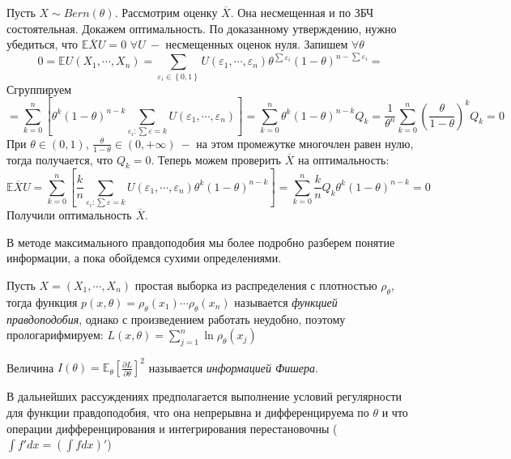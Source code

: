 \begin{example}
Пусть $X \sim Bern\left(\theta\right)$. Рассмотрим оценку $\overline{X}$. Она несмещенная и по ЗБЧ состоятельная.  Докажем оптимальность. По доказанному утверждению, нужно убедиться, что $\mathbb{E} \overline{X} U = 0$ $\forall U \ -$ несмещенных оценок нуля. Запишем $\forall \theta$
\[
    0 =\mathbb{E} U\left(X_1, \cdots, X_n\right) = \sum_{\varepsilon_i \in \left\{0, 1\right\} } U\left(\varepsilon_1, \cdots, \varepsilon_n\right) \theta ^ {\sum \varepsilon_i} \left(1 - \theta\right) ^ {n - \sum \varepsilon_i} = 
\]
Сгруппируем
\[
    = \sum_{k = 0}^{n}  \left[\theta ^ {k} \left(1 - \theta\right) ^ {n - k} \sum_{\varepsilon_i: \sum \varepsilon = k} U\left(\varepsilon_1, \cdots, \varepsilon_n\right)\right] = \sum_{k = 0}^{n}  \theta ^ {k} \left(1 - \theta\right) ^ {n - k} Q_k = \frac 1 {\theta ^ n} \sum_{k = 0}^{n}  \left(\frac{\theta}{1 - \theta}\right) ^ k Q_k = 0
\]
При $\theta \in \left(0, 1\right)$, $\frac{\theta}{1 - \theta} \in \left(0, +\infty\right) \ - $ на этом промежутке многочлен равен нулю, тогда получается, что $Q_k = 0$. Теперь можем проверить $\overline{X}$ на оптимальность:
\[
    \mathbb{E} \overline{X} U = \sum_{k = 0}^{n} \left[\frac{k}{n} \sum_{\varepsilon_i: \sum \varepsilon = k} U\left(\varepsilon_1, \cdots, \varepsilon_n\right) \theta ^ {k} \left(1 - \theta\right) ^ {n - k}\right] = \sum_{k = 0}^{n} \frac k n Q_k \theta ^ {k} \left(1 - \theta\right) ^ {n - k} = 0
\]
Получили оптимальность $\overline{X}$. 
\end{example}
В методе максимального правдоподобия мы более подробно разберем понятие информации, а пока обойдемся сухими определениями.
\begin{definition}
Пусть $X = \left(X_1, \cdots, X_n\right)$ простая выборка из распределения с плотностью $\rho_\theta$, тогда функция $p\left(x, \theta\right) = \rho_{\theta}\left(x_1\right) \cdots \rho_\theta\left(x_n\right)$ называется \textit{функцией правдоподобия}, однако с произведением работать неудобно, поэтому прологарифмируем: $L\left(x, \theta\right) = \sum_{j = 1}^n \ln \rho_\theta\left(x_j\right)$
\end{definition}
\begin{definition}
Величина $I\left(\theta\right) = \mathbb{E}_\theta \left[\frac{\partial L}{\partial \theta}\right] ^ 2$ называется \textit{информацией Фишера}.
\end{definition}
В дальнейших рассуждениях предполагается выполнение условий регулярности для функции правдоподобия, что она непрерывна и дифференцируема по $\theta$ и что операции дифференцирования и интегрирования перестановочны ($\int f' dx = \left(\int f dx\right)'$)
